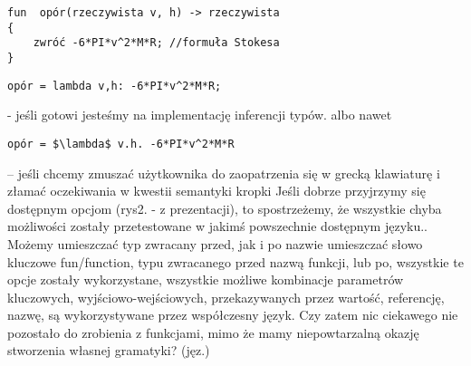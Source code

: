 \begin{lstlisting}
fun  opór(rzeczywista v, h) -> rzeczywista
{
	zwróć -6*PI*v^2*M*R; //formuła Stokesa
}
\end{lstlisting}
\begin{lstlisting}
opór = lambda v,h: -6*PI*v^2*M*R;\end{lstlisting} - jeśli gotowi jesteśmy na implementację inferencji typów.
albo nawet 
\begin{lstlisting}
opór = $\lambda$ v.h. -6*PI*v^2*M*R\end{lstlisting} – jeśli chcemy zmuszać użytkownika do zaopatrzenia się w grecką klawiaturę i złamać oczekiwania w kwestii semantyki kropki
Jeśli dobrze przyjrzymy się dostępnym opcjom (rys2. - z prezentacji), to spostrzeżemy, że wszystkie chyba możliwości zostały przetestowane w jakimś powszechnie dostępnym języku.. Możemy umieszczać typ zwracany przed, jak i po nazwie umieszczać słowo kluczowe fun/function, typu zwracanego przed nazwą funkcji, lub po, wszystkie te opcje zostały wykorzystane, wszystkie możliwe kombinacje parametrów kluczowych, wyjściowo-wejściowych, przekazywanych przez wartość, referencję, nazwę, są wykorzystywane przez współczesny język. 
Czy zatem nic ciekawego nie pozostało do zrobienia z funkcjami, mimo że mamy niepowtarzalną okazję stworzenia własnej gramatyki? (jęz.)

